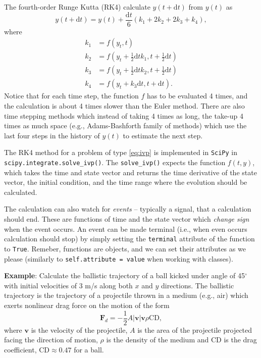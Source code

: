 \documentclass{article}
\newcommand{\dd}{\ensuremath{\mathrm{d}}}
\newcommand{\bv}[1]{\ensuremath{\mathbf{#1}}}
\newcommand{\ls}[1]{\lstinline{#1}}
\begin{document}
The fourth-order Runge Kutta (RK4) calculate $y(t + \dd t)$ from $y(t)$ as
\begin{equation}
    \label{eq:RK4}
    y(t + \dd t) = y(t) + \frac{\dd t}{6}\left(k_1 + 2k_2 + 2k_3 + k_4\right),
\end{equation}
where
\begin{equation}
    \begin{aligned}
        k_1 &= f(y_t, t)\\
        k_2 &= f\left(y_t + \frac{1}{2}\dd t k_1, t + \frac{1}{2}\dd t\right)\\
        k_3 &= f\left(y_t + \frac{1}{2}\dd t k_2, t + \frac{1}{2}\dd t\right)\\
        k_4 &= f(y_t + k_3 \dd t, t + \dd t).
    \end{aligned}
\end{equation}
Notice that for each time step, the function $f$ has to be evaluated 4 times, and the calculation is about 4 times slower than the Euler method. There are also time stepping methods which instead of taking 4 times as long, the take-up 4 times as much space (e.g., Adams-Bashforth family of methods) which use the last four steps in the history of $y(t)$ to estimate the next step.

The RK4 method for a problem of type \eqref{eq:ivp} is implemented in \verb|SciPy| in \ls{scipy.integrate.solve_ivp()}. The \ls{solve_ivp()} expects the function $f(t, y)$, which takes the time and state vector and returns the time derivative of the state vector, the initial condition, and the time range where the evolution should be calculated.

The calculation can also watch for \emph{events} -- typically a signal, that a calculation should end. These are functions of time and the state vector which \emph{change sign} when the event occurs. An event can be made terminal (i.e., when even occurs calculation should stop) by simply setting the \ls{terminal} attribute of the function to \ls{True}. Remeber, functions are objects, and we can set their attributes as we please (similarly to \ls{self.attribute = value} when working with classes).

\textbf{Example}: Calculate the ballistic trajectory of a ball kicked under angle of 45$^\circ$ with initial velocities of 3 m/s along both $x$ and $y$ directions. The ballistic trajectory is the trajectory of a projectile thrown in a medium (e.g., air) which exerts nonlinear drag force on the motion of the form
\begin{equation}
    \bv F_d = -\frac{1}{2}A|\bv v|\bv v \rho \mathrm{CD},
\end{equation}
where $\bv v$ is the velocity of the projectile, $A$ is the area of the projectile projected facing the direction of motion, $\rho$ is the density of the medium and CD is the drag coefficient, $\mathrm{CD}\approx0.47$ for a ball.
\end{document}
